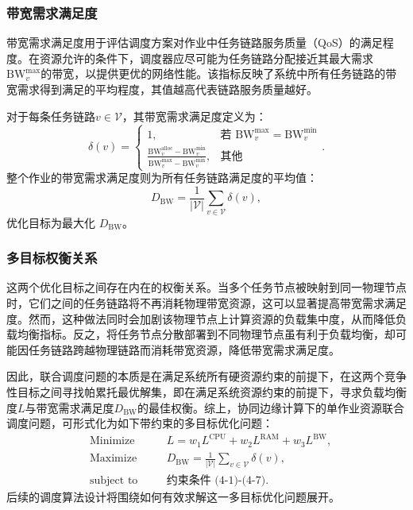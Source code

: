\subsubsection{带宽需求满足度}
带宽需求满足度用于评估调度方案对作业中任务链路服务质量（QoS）的满足程度。在资源允许的条件下，调度器应尽可能为任务链路分配接近其最大需求$\text{BW}_v^{\max}$的带宽，以提供更优的网络性能。该指标反映了系统中所有任务链路的带宽需求得到满足的平均程度，其值越高代表链路服务质量越好。

对于每条任务链路$v \in \mathcal{V}$，其带宽需求满足度定义为：
\begin{equation}
\delta(v) =
\begin{cases}
1, & \text{若 } \text{BW}_v^{\max} = \text{BW}_v^{\min} \\
\frac{\text{BW}_v^{\text{alloc}} - \text{BW}_v^{\min}}{\text{BW}_v^{\max} - \text{BW}_v^{\min}}, & \text{其他}
\end{cases}.
\end{equation}
整个作业的带宽需求满足度则为所有任务链路满足度的平均值：
\begin{equation}
D_{\text{BW}} = \frac{1}{|\mathcal{V}|} \sum_{v \in \mathcal{V}} \delta(v),
\end{equation}
优化目标为最大化 $D_{\text{BW}}$。

\subsubsection{多目标权衡关系}
这两个优化目标之间存在内在的权衡关系。当多个任务节点被映射到同一物理节点时，它们之间的任务链路将不再消耗物理带宽资源，这可以显著提高带宽需求满足度。然而，这种做法同时会加剧该物理节点上计算资源的负载集中度，从而降低负载均衡指标。反之，将任务节点分散部署到不同物理节点虽有利于负载均衡，却可能因任务链路跨越物理链路而消耗带宽资源，降低带宽需求满足度。

因此，联合调度问题的本质是在满足系统所有硬资源约束的前提下，在这两个竞争性目标之间寻找帕累托最优解集，即在满足系统资源约束的前提下，寻求负载均衡度$L$与带宽需求满足度$D_{\text{BW}}$的最佳权衡。综上，协同边缘计算下的单作业资源联合调度问题，可形式化为如下带约束的多目标优化问题：
\begin{equation}
\begin{aligned}
& \text{Minimize} && \quad L = w_1 L^{\text{CPU}} + w_2 L^{\text{RAM}} + w_3 L^{\text{BW}}, \\
& \text{Maximize} && \quad D_{\text{BW}} = \frac{1}{|\mathcal{V}|} \sum_{v \in \mathcal{V}} \delta(v), \\
& \text{subject to} && \quad \text{约束条件 (4-1)-(4-7)}.
\end{aligned}
\end{equation}
后续的调度算法设计将围绕如何有效求解这一多目标优化问题展开。

